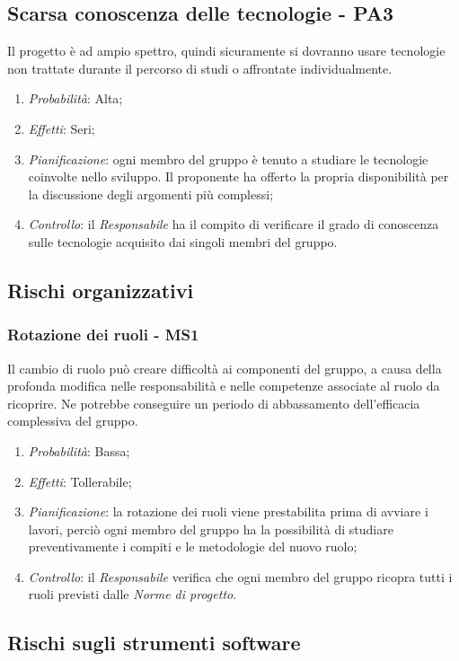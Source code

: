 \subsection{Scarsa conoscenza delle tecnologie - PA3}
Il progetto \`e ad ampio spettro, quindi sicuramente si dovranno usare tecnologie non trattate durante il percorso di studi o affrontate individualmente.
\begin{enumerate}
\item \textit{Probabilit\`a}: Alta;
\item \textit{Effetti}: Seri;
\item \textit{Pianificazione}: ogni membro del gruppo \`e tenuto a studiare le tecnologie coinvolte nello sviluppo. Il proponente ha offerto la propria disponibilit\`a per la discussione degli argomenti pi\`u complessi;
\item \textit{Controllo}: il \textit{Responsabile} ha il compito di verificare il grado di conoscenza sulle tecnologie acquisito dai singoli membri del gruppo.
\end{enumerate}

\subsection{Rischi organizzativi}
\subsubsection{Rotazione dei ruoli - MS1}
Il cambio di ruolo pu\`o creare difficolt\`a ai componenti del gruppo, a causa della profonda modifica nelle responsabilit\`a e nelle competenze associate al ruolo da ricoprire. Ne potrebbe conseguire un periodo di abbassamento dell'efficacia complessiva del gruppo.
\begin{enumerate}
\item \textit{Probabilit\`a}: Bassa;
\item \textit{Effetti}: Tollerabile;
\item \textit{Pianificazione}: la rotazione dei ruoli viene prestabilita prima di avviare i lavori, perci\`o ogni membro del gruppo ha la possibilit\`a di studiare preventivamente i compiti e le metodologie del nuovo ruolo;
\item \textit{Controllo}: il \textit{Responsabile} verifica che ogni membro del gruppo ricopra tutti i ruoli previsti dalle \textit{Norme di progetto}.
\end{enumerate}

\subsection{Rischi sugli strumenti software}
